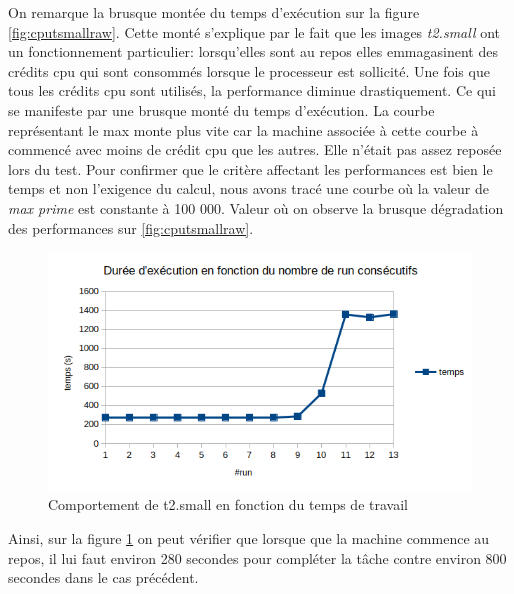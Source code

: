 \documentclass[11pt]{article}
\begin{document}
On remarque la brusque montée du temps d'exécution sur la figure \ref{fig:cputsmallraw}. Cette monté s'explique par le fait que les images \textit{t2.small} ont un fonctionnement particulier: lorsqu'elles sont au repos elles emmagasinent des crédits cpu qui sont consommés lorsque le processeur est sollicité. Une fois que tous les crédits cpu sont utilisés, la performance diminue drastiquement. Ce qui se manifeste par une brusque monté du temps d'exécution. La courbe représentant le max monte plus vite car la machine associée à cette courbe à commencé avec moins de crédit cpu que les autres. Elle n'était pas assez reposée lors du test. Pour confirmer que le critère affectant les performances est bien le temps et non l'exigence du calcul, nous avons tracé une courbe où la valeur de \textit{max prime} est constante à 100 000. Valeur où on observe la brusque dégradation des performances sur \ref{fig:cputsmallraw}.

\begin{figure}
\centering
\includegraphics[width=0.9\linewidth]{images/constCpu}
\caption{Comportement de t2.small en fonction du temps de travail}
\label{fig:constcpu}
\end{figure}
Ainsi, sur la figure \ref{fig:constcpu} on peut vérifier que lorsque que la machine commence au repos, il lui faut environ 280 secondes pour compléter la tâche contre environ 800 secondes dans le cas précédent.
\end{document}
